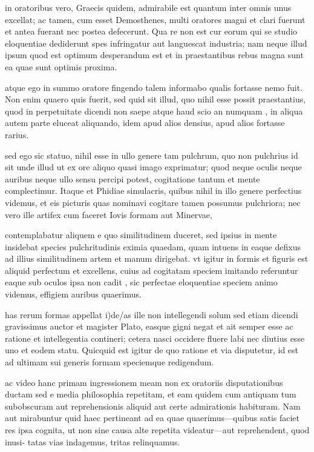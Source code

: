  in oratoribus vero, Graecis quidem, admirabile est quantum inter omnis unus excellat; ac tamen, cum esset Demosthenes, multi oratores magni et clari fuerunt et antea fuerant nec postea defecerunt. Qua re non est cur eorum qui se studio eloquentiae dediderunt spes infringatur aut languescat industria; nam neque illud ipsum quod est optimum desperandum est et in praestantibus rebus magna sunt ea quae sunt optimis proxima.

 atque ego in summo oratore fingendo talem informabo qualis fortasse nemo fuit. Non enim quaero quis fuerit, sed quid sit illud, quo nihil esse possit praestantius, quod in perpetuitate dicendi non saepe atque haud scio an numquam , in aliqua autem parte eluceat aliquando, idem apud alios densius, apud alios fortasse rarius.

 sed ego sic statuo, nihil esse in ullo genere tam pulchrum, quo non pulchrius id sit unde illud ut ex ore aliquo quasi imago exprimatur; quod neque oculis neque auribus neque ullo sensu percipi potest, cogitatione tantum et mente complectimur. Itaque et Phidiae simulacris, quibus nihil in illo genere perfectius videmus, et eis picturis quas nominavi cogitare tamen possumus pulchriora; nec vero ille artifex cum faceret Iovis formam aut Minervae,

 contemplabatur aliquem e quo similitudinem duceret, sed ipsius in mente insidebat species pulchritudinis eximia quaedam, quam intuens in eaque defixus ad illius similitudinem artem et manum dirigebat. vt igitur in formis et figuris est aliquid perfectum et excellens, cuius ad cogitatam speciem imitando referuntur eaque sub oculos ipsa non cadit , sic perfectae eloquentiae speciem animo videmus, effigiem auribus quaerimus.

 has rerum formas appellat i)de/as ille non intellegendi solum sed etiam dicendi gravissimus auctor et magister Plato, easque gigni negat et ait semper esse ac ratione et intellegentia contineri; cetera nasci occidere fluere labi nec diutius esse uno et eodem statu. Quicquid est igitur de quo ratione et via disputetur, id est ad ultimam sui generis formam speciemque redigendum.

 ac video hanc primam ingressionem meam non ex oratoriis disputationibus ductam sed e media philosophia repetitam, et eam quidem cum antiquam tum subobscuram aut reprehensionis aliquid aut certe admirationis habituram. Nam aut mirabuntur quid haec pertineant ad ea quae quaerimus—quibus satis faciet res ipsa cognita, ut non sine causa alte repetita videatur—aut reprehendent, quod inusi- tatas vias indagemus, tritas relinquamus.

